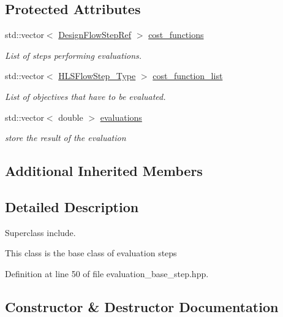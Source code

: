 \subsection*{Protected Attributes}
\begin{DoxyCompactItemize}
\item 
std\+::vector$<$ \hyperlink{design__flow__step_8hpp_a9dd6b4474ddf52d41a78b1aaa12ae6c8}{Design\+Flow\+Step\+Ref} $>$ \hyperlink{classEvaluationBaseStep_abdac7bdf7843ec1eb93765ee68ce7a17}{cost\+\_\+functions}
\begin{DoxyCompactList}\small\item\em List of steps performing evaluations. \end{DoxyCompactList}\item 
std\+::vector$<$ \hyperlink{hls__step_8hpp_ada16bc22905016180e26fc7e39537f8d}{H\+L\+S\+Flow\+Step\+\_\+\+Type} $>$ \hyperlink{classEvaluationBaseStep_af91f1c56d40e88db533715ba41c89396}{cost\+\_\+function\+\_\+list}
\begin{DoxyCompactList}\small\item\em List of objectives that have to be evaluated. \end{DoxyCompactList}\item 
std\+::vector$<$ double $>$ \hyperlink{classEvaluationBaseStep_a00fc155f9398fd619dfc504d539231c7}{evaluations}
\begin{DoxyCompactList}\small\item\em store the result of the evaluation \end{DoxyCompactList}\end{DoxyCompactItemize}
\subsection*{Additional Inherited Members}


\subsection{Detailed Description}
Superclass include. 

This class is the base class of evaluation steps 

Definition at line 50 of file evaluation\+\_\+base\+\_\+step.\+hpp.



\subsection{Constructor \& Destructor Documentation}
\mbox{\label{classEvaluationBaseStep_a342fa9b4206d579b50fc06527387c67e}} 
